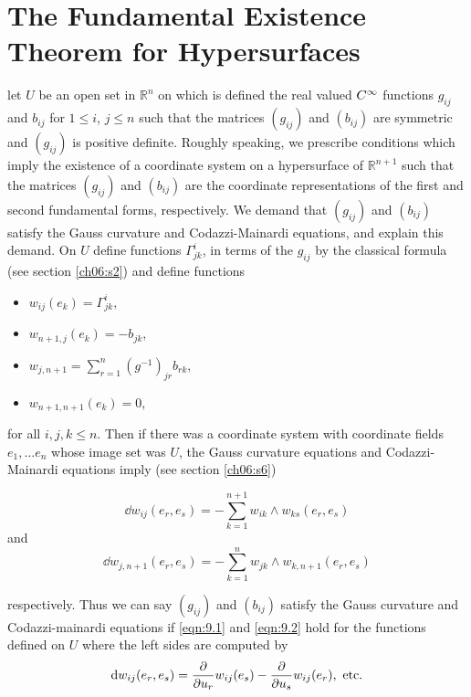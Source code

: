 \documentclass[../main]{subfiles}
\begin{document}
\section{The Fundamental Existence Theorem for Hypersurfaces}\label{ch09:s2}

let $U$ be an open set in $\mathbb{R}^n$ on which is defined the real valued $C^\infty$ functions $g_{ij}$ and $b_{ij}$ for $1 \leq i$,  $j \leq n$ such that the matrices $(g_{ij})$ and $(b_{ij})$ are symmetric and $(g_{ij})$ is positive definite. Roughly speaking, we prescribe conditions which imply the existence of a coordinate system on a hypersurface of $\mathbb{R}^{n+1}$ such that the matrices $(g_{ij})$ and $(b_{ij})$ are the coordinate representations of the first and second fundamental forms, respectively. We demand that $(g_{ij})$ and $(b_{ij})$ satisfy the Gauss curvature and Codazzi-Mainardi equations, and explain this demand. On $U$ define functions $\Gamma^i_{jk}$, in terms of the $g_{ij}$ by the classical formula (see section \ref{ch06:s2}) and define functions
\begin{itemize}
    \item $w_{ij}(e_k) = \Gamma^i_{jk},$
    \item $w_{n+1,j}(e_k) = -b_{jk},$
    \item $w_{j,n+1} = \displaystyle \sum_{r=1}^n (g^{-1})_{jr}b_{rk},$
    \item $w_{n+1,n+1}(e_k) = 0$,
\end{itemize}
 for all $i, j, k \leq n$. Then if there was a coordinate system with coordinate fields $e_1 , \dots e_n$ whose image set was $U$, the Gauss curvature equations and Codazzi-Mainardi equations imply (see section \ref{ch06:s6})

\begin{equation}\tag{1}\label{eqn:9.1}
     \dd{w}_{ij}(e_r, e_s) = -\sum_{k = 1}^{n+1}w_{ik} \wedge w_{ks}(e_r, e_s)
\end{equation}
and
\begin{equation}\tag{2}\label{eqn:9.2}
      \dd{w}_{j,n+1}(e_r, e_s) = -\sum_{k = 1}^{n}w_{jk} \wedge w_{k,n+1}(e_r, e_s)
 \end{equation}

respectively. Thus we can say $(g_{ij})$ and $(b_{ij})$ satisfy the Gauss curvature and Codazzi-mainardi equations if \ref{eqn:9.1} and \ref{eqn:9.2} hold for the functions defined on $U$ where the left sides are computed by \[\mathrm{d}w_{ij}(e_r, e_s) = \dfrac{\partial }{\partial u_r}w_{ij}(e_s) - \dfrac{\partial }{\partial u_s}w_{ij}(e_r),\text{ etc.}\]
\end{document}
